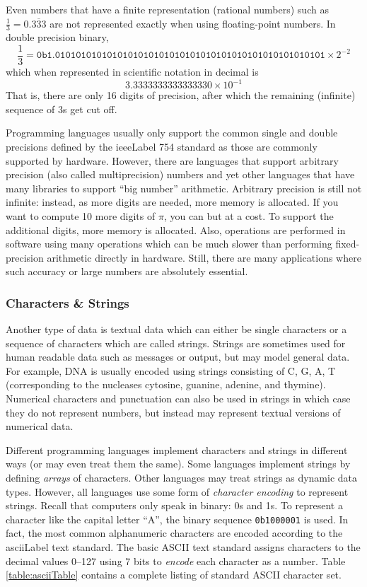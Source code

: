 Even numbers that have a finite representation (rational numbers) such as 
$\frac{1}{3} = 0.\overline{333}$ are not represented exactly when using floating-point numbers.
In double precision binary, 
  $$\frac{1}{3} = \texttt{0b1.0101010101010101010101010101010101010101010101010101} \times 2^{-2}$$
which when represented in scientific notation in decimal is
  $$3.3333333333333330 \times 10^{-1}$$
That is, there are only 16 digits of precision, after which the remaining (infinite) sequence of $3$s 
get cut off.

Programming languages usually only support the common single and double precisions
defined by the \gls{ieeeLabel} 754 standard as those are commonly supported by hardware.
However, there are languages that support arbitrary precision (also called multiprecision) 
numbers and yet other languages that have many libraries to support ``big number'' arithmetic.
Arbitrary precision is still not infinite: instead, as more digits are needed, more memory is
allocated.  If you want to compute 10 more digits of $\pi$, you can but at a cost.  To support
the additional digits, more memory is allocated.  Also, operations are performed in software
using many operations which can be much slower than performing fixed-precision arithmetic
directly in hardware.  Still, there are many applications where such accuracy or large numbers
are absolutely essential.  

\subsubsection{Characters \& Strings}

Another type of data is textual data which can either be single characters or a sequence of
characters which are called \glspl{string}.  Strings are sometimes used for human readable
data such as messages or output, but may model general data.  For example, DNA is
usually encoded using strings consisting of C, G, A, T (corresponding to the nucleases
cytosine, guanine, adenine, and thymine).  Numerical characters and punctuation can
also be used in strings in which case they do not represent numbers, but instead may
represent textual versions of numerical data.  

Different programming languages implement characters and strings in different ways 
(or may even treat them the same).  Some languages implement strings by defining
\emph{arrays} of characters.  Other languages may treat strings as dynamic data types.
However, all languages use some form of \emph{character encoding} to represent
strings.  Recall that computers only speak in binary: 0s and 1s.  To represent a character
like the capital letter ``A'', the binary sequence \texttt{0b1000001} is used.  In fact, the
most common alphanumeric characters are encoded according to the \gls{asciiLabel}
text standard.  The basic ASCII text standard assigns characters to the decimal values
0--127 using 7 bits to \emph{encode} each character as a number.  Table \ref{table:asciiTable}
contains a complete listing of standard ASCII character set.  


